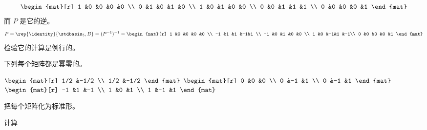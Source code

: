 \begin{exercises}
\begin{answer}
\begin{exparts}
\begin{equation*}
\begin{mat}[r]
               1 &0 &0 &0 &0 \\
               0 &1 &0 &1 &0 \\
               1 &0 &1 &0 &0 \\
               0 &0 &1 &1 &1 \\
               0 &0 &0 &0 &1
             \end{mat}
          \end{equation*}
          而 $P$ 是它的逆。
          \begin{equation*}
            P=\rep{\identity}{\stdbasis_5,B}
             =(P^{-1})^{-1}
            =\begin{mat}[r]
               1 &0 &0 &0 &0 \\
              -1 &1 &1 &-1&1 \\
              -1 &0 &1 &0 &0 \\
               1 &0 &-1&1 &-1\\
               0 &0 &0 &0 &1
             \end{mat}
          \end{equation*}
         \partsitem 检验它的计算是例行的。
       \end{exparts}
     \end{answer}
   \recommended \item
     下列每个矩阵都是幂零的。
     \begin{exparts*}
       \partsitem \(
         \begin{mat}[r]
           1/2  &-1/2  \\
           1/2  &-1/2
         \end{mat}        \)
       \partsitem \(
         \begin{mat}[r]
           0  &0  &0  \\
           0  &-1 &1  \\
           0  &-1 &1
         \end{mat}        \)
       \partsitem \(
         \begin{mat}[r]
          -1  &1  &-1 \\
           1  &0  &1  \\
           1  &-1 &1
         \end{mat}        \)
     \end{exparts*}
     把每个矩阵化为标准形。
     \begin{answer}
       \begin{exparts}
       \partsitem 计算
         \begin{center}
           \begin{tabular}{c|cc}

\end{tabular}
\end{center}
\end{exparts}
\end{answer}
\end{exercises}

